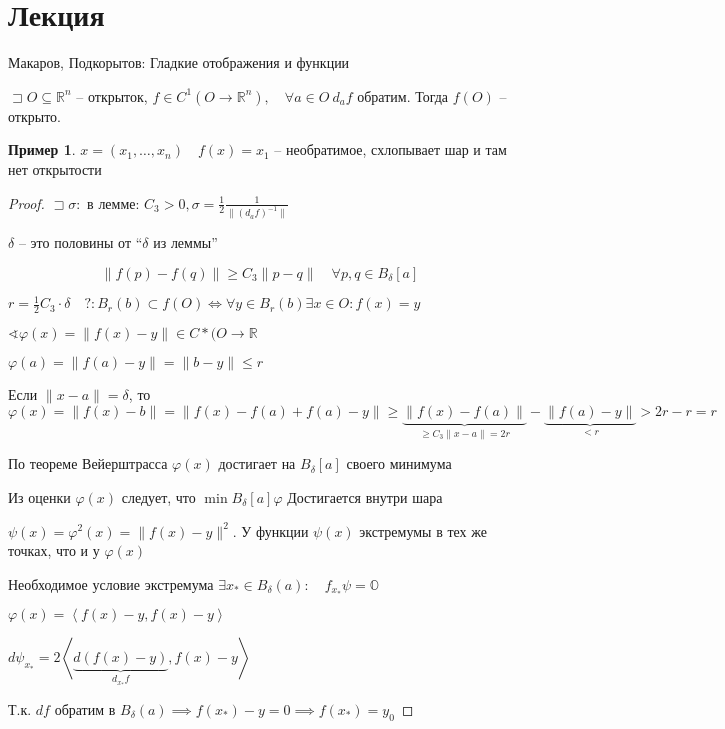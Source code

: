\documentclass{book}
\newcommand\R{\ensuremath{\mathbb{R}}}
\theoremstyle{definition}
\newtheorem*{example}{Пример}
\begin{document}
        \section{Лекция}

        Макаров, Подкорытов: Гладкие отображения и функции

        \begin{theorem}

            $\sqsupset O\subseteq \R^n$ -- открыток, $f\in C^1(O\to \R^n), \quad \forall a\in O\ d_af$ обратим. Тогда $f(O)$ -- открыто.
        \end{theorem}
        \begin{example}
            $x = \left( x_1, \ldots, x_n \right) \quad f(x) = x_1$ -- необратимое, схлопывает шар и там нет открытости
        \end{example}
        \begin{proof}
            $\sqsupset \sigma:$ в лемме: $C_3>0, \sigma = \frac{1}{2} \frac{1}{\|\left( d_af \right) ^{-1}\|}$ 

            $\delta$ -- это половины от  ``$\delta$ из леммы''

            \[\|f(p)-f(q)\| \geqslant C_3\|p-q\|\quad \forall p, q\in B_{\delta}[a]\]

            $r = \frac{1}{2} C_3\cdot \delta\quad ?:B_r(b)\subset f(O) \iff \forall y\in B_r(b) \exists x\in O: f(x) = y$ 

            $\sphericalangle \varphi(x) = \|f(x) - y\|\in C*(O\to \R$

            $\varphi(a) = \|f(a) - y\| = \|b-y\|\leqslant r$


            Если $\|x-a\| = \delta$, то $\varphi(x) = \|f(x) - b\| = \|f(x) - f(a) + f(a) - y\|\geqslant \underbrace{\|f(x) - f(a)\|}_{\geqslant C_3\|x-a\| = 2r} - \underbrace{\|f(a) - y\|}_{<r} > 2r-r = r$

            По теореме Вейерштрасса $\varphi(x)$ достигает на  $B_{\delta}[a]$ своего минимума

            Из оценки  $\varphi(x)$ следует, что  $\min\limits{B_{\delta}[a]}\varphi$ Достигается внутри шара

            $\psi(x) = \varphi^2(x) = \|f(x) - y\|^2$. У функции $\psi(x)$ экстремумы в тех же точках, что и у  $\varphi(x)$

            Необходимое условие экстремума $\exists x_*\in B_{\delta}(a):\quad f_{x_*}\psi = \mathbb O$

            $\varphi(x) = \left<f(x) - y, f(x) - y \right>$

            $d\psi_{x_*} = 2\left<\underbrace{d(f\left( x \right) -y)}_{d_{x_*}f}, f(x) - y \right>$

            Т.к. $df$ обратим в  $B_{\delta}(a) \implies f(x_*)-y=0 \implies f(x_*) = y_0$

        \end{proof}
\end{document}
